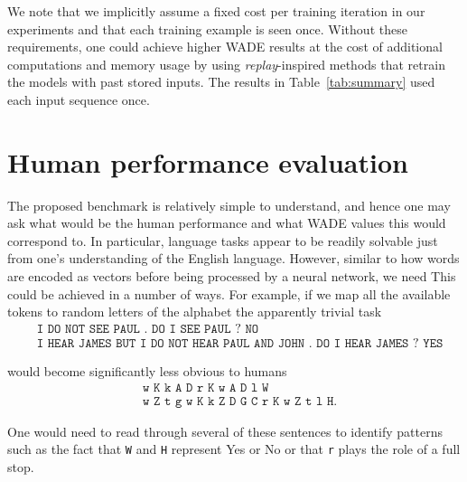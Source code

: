 We note that we implicitly assume a fixed cost per training iteration in our
experiments and that each training example is seen once. Without these
requirements, one could achieve higher WADE results at the cost of additional
computations and memory usage by using \emph{replay}-inspired methods
\parencite{hintonUsingFastWeights1987, robinsCatastrophicForgettingNeural1993a,
  gepperthBioInspiredIncrementalLearning2016,
  rebuffiIcarlIncrementalClassifier2017} that retrain the models with past
stored inputs. The results in Table~\ref{tab:summary} used each input sequence
once.

\section{Human performance evaluation}
\label{sec:human}
The proposed benchmark is relatively simple to understand, and hence one may ask
what would be the human performance and what WADE values this would correspond
to. In particular, language tasks appear to be readily solvable just from
one's understanding of the English language. However, similar to how words are
encoded as vectors before being processed by a neural network, we need This
could be achieved in a number of ways. For example, if we map all the available
tokens to random letters of the alphabet the apparently trivial task
{\small \begin{align*}
          & \texttt{I DO NOT SEE PAUL . DO I SEE PAUL ? NO} \\
          & \texttt{I HEAR JAMES BUT I DO NOT HEAR PAUL AND JOHN . DO I HEAR JAMES ? YES}
\end{align*}}

would become significantly less obvious to humans
{\small
\begin{align*}
  & \texttt{w K k A D r K w A D l W} \\
  & \texttt{w Z t g w K k Z D G C r K w Z t l H}.
\end{align*}
}

One would need to read through several of these sentences to identify patterns
such as the fact that \texttt{W} and \texttt{H} represent Yes or No or that
\texttt{r} plays the role of a full stop.

